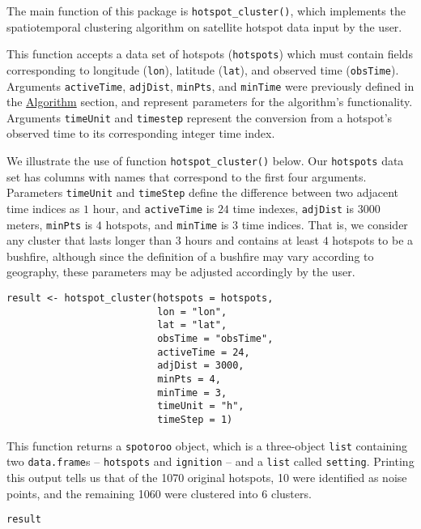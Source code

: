 The main function of this package is \texttt{hotspot\_cluster()}, which implements the spatiotemporal clustering algorithm on satellite hotspot data input by the user.

This function accepts a data set of hotspots (\texttt{hotspots}) which must contain fields corresponding to longitude (\texttt{lon}), latitude (\texttt{lat}), and observed time (\texttt{obsTime}). Arguments \texttt{activeTime}, \texttt{adjDist}, \texttt{minPts}, and \texttt{minTime} were previously defined in the \protect\hyperlink{algorithm}{Algorithm} section, and represent parameters for the algorithm's functionality. Arguments \texttt{timeUnit} and \texttt{timestep} represent the conversion from a hotspot's observed time to its corresponding integer time index.

We illustrate the use of function \texttt{hotspot\_cluster()} below. Our \texttt{hotspots} data set has columns with names that correspond to the first four arguments. Parameters \texttt{timeUnit} and \texttt{timeStep} define the difference between two adjacent time indices as \(1\) hour, and \texttt{activeTime} is \(24\) time indexes, \texttt{adjDist} is \(3000\) meters, \texttt{minPts} is \(4\) hotspots, and \texttt{minTime} is \(3\) time indices. That is, we consider any cluster that lasts longer than \(3\) hours and contains at least \(4\) hotspots to be a bushfire, although since the definition of a bushfire may vary according to geography, these parameters may be adjusted accordingly by the user.

\begin{verbatim}
result <- hotspot_cluster(hotspots = hotspots,
                          lon = "lon",
                          lat = "lat",
                          obsTime = "obsTime",
                          activeTime = 24,
                          adjDist = 3000,
                          minPts = 4,
                          minTime = 3,
                          timeUnit = "h",
                          timeStep = 1)
\end{verbatim}

This function returns a \texttt{spotoroo} object, which is a three-object \texttt{list} containing two \texttt{data.frame}s -- \texttt{hotspots} and \texttt{ignition} -- and a \texttt{list} called \texttt{setting}. Printing this output tells us that of the 1070 original hotspots, 10 were identified as noise points, and the remaining 1060 were clustered into 6 clusters.

\begin{verbatim}
result
\end{verbatim}

